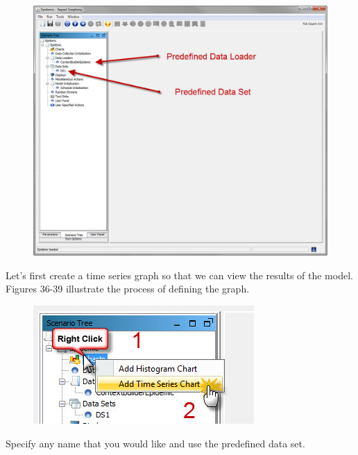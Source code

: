 \documentclass[11pt]{amsart}
\begin{document}
\begin{figure}[ht]
\begin{center}
\vspace{.2in}
\centerline {
\includegraphics[totalheight=0.3\textheight]{images/035.jpg}
}
\caption{}
\label{fig:035}
\end{center}
\end{figure}

Let’s first create a time series graph so that we can view the results of the model. Figures 36-39 illustrate the process of defining the graph.


\begin{figure}[ht]
\begin{center}
\vspace{.2in}
\centerline {
\includegraphics[totalheight=0.3\textheight]{images/036.jpg}
}
\caption{}
\label{fig:036}
\end{center}
\end{figure}

Specify any name that you would like and use the predefined data set.
\end{document}
